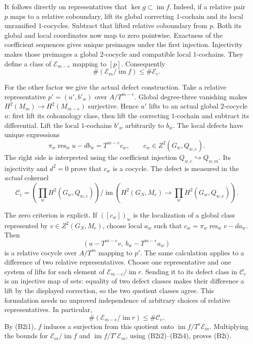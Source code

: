 It follows directly on representatives that
\(\ker g\subset\operatorname{im}f\).
Indeed, if a relative pair \(p\) maps to a relative coboundary,
lift its global correcting \(1\)-cochain and its local unramified
\(1\)-cocycles.
Subtract that lifted relative coboundary from \(p\).
Both its global and local coordinates now map to zero pointwise.
Exactness of the coefficient sequences gives unique preimages
under the first injection.  Injectivity makes those preimages
a global \(2\)-cocycle and compatible local \(1\)-cochains.
They define a class of \(\mathcal E_{m-e}\) mapping to \([p]\).
Consequently
\[
                 \#(\mathcal E_m/\operatorname{im}f)
                                    \leq\#\mathcal E_e.
 \tag{B2i2}
\]

For the other factor we give the actual defect construction.
Take a relative representative
\(p'=(u',b'_w)\) over \(A/T^{m-e}\).
Global degree-three vanishing makes
\(H^2(M_m)\to H^2(M_{m-e})\) surjective.
Hence \(u'\) lifts to an actual global \(2\)-cocycle \(u\):
first lift its cohomology class, then lift the correcting
\(1\)-cochain and subtract its differential.
Lift the local \(1\)-cochains \(b'_w\) arbitrarily to \(b_w\).
The local defects have unique expressions
\[
 \pi_w\operatorname{res}_w u-db_w
               =T^{m-e}c_w,\qquad c_w\in Z^2(G_w,Q_{w,e}).
 \tag{B2i3}
\]
The right side is interpreted using the coefficient injection
\(Q_{w,e}\hookrightarrow Q_{w,m}\).
Its injectivity and \(d^2=0\) prove that \(c_w\) is a cocycle.
The defect is measured in the \emph{actual} cokernel
\[
 \mathcal C_e=
  \left(\prod_wH^2(G_w,Q_{w,e})\right)/
       \operatorname{im}\!\left(H^2(G_N,M_e)
                       \longrightarrow\prod_wH^2(G_w,Q_{w,e})\right).
\]

The zero criterion is explicit.
If \(([c_w])_w\) is the localization of a global class represented
by \(v\in Z^2(G_N,M_e)\), choose local \(a_w\) such that
\(c_w=\pi_w\operatorname{res}_wv-da_w\).
Then
\[
       (u-T^{m-e}v,\ b_w-T^{m-e}a_w)
\]
is a relative cocycle over \(A/T^m\) mapping to \(p'\).
The same calculation applies to a difference of two relative
representatives.  Choose one representative and one system of
lifts for each element of
\(\mathcal E_{m-e}/\operatorname{im}r\).
Sending it to its defect class in \(\mathcal C_e\) is an
injective map of sets: equality of two defect classes makes
their difference a lift by the displayed correction, so the
two quotient classes agree.
This formulation needs no unproved independence of arbitrary
choices of relative representatives.  In particular,
\[
           \#(\mathcal E_{m-e}/\operatorname{im}r)
                                            \leq\#\mathcal C_e.
 \tag{B2i4}
\]
By (B2i1), \(f\) induces a surjection from this quotient onto
\(\operatorname{im}f/T^e\mathcal E_m\).
Multiplying the bounds for
\(\mathcal E_m/\operatorname{im}f\) and
\(\operatorname{im}f/T^e\mathcal E_m\), using (B2i2)--(B2i4),
proves (B2i).

